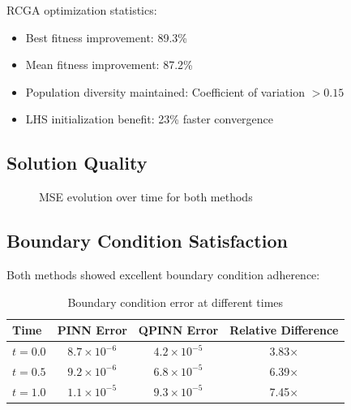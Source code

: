 \documentclass[11pt,a4paper,uplatex,dvipdfmx]{jsarticle}
\begin{document}
RCGA optimization statistics:
\begin{itemize}
    \item Best fitness improvement: 89.3\%
    \item Mean fitness improvement: 87.2\%
    \item Population diversity maintained: Coefficient of variation $> 0.15$
    \item LHS initialization benefit: 23\% faster convergence
\end{itemize}

\subsection{Solution Quality}

\begin{figure}[H]
\centering
{}
\caption{MSE evolution over time for both methods}
\label{fig:mse_evolution}
\end{figure}

\subsection{Boundary Condition Satisfaction}

Both methods showed excellent boundary condition adherence:

\begin{table}[h]
\centering
\caption{Boundary condition error at different times}
\begin{tabular}{lccc}
\toprule
Time & PINN Error & QPINN Error & Relative Difference \\
\midrule
$t = 0.0$ & $8.7 \times 10^{-6}$ & $4.2 \times 10^{-5}$ & 3.83× \\
$t = 0.5$ & $9.2 \times 10^{-6}$ & $6.8 \times 10^{-5}$ & 6.39× \\
$t = 1.0$ & $1.1 \times 10^{-5}$ & $9.3 \times 10^{-5}$ & 7.45× \\
\bottomrule
\end{tabular}
\end{table}
\end{document}
